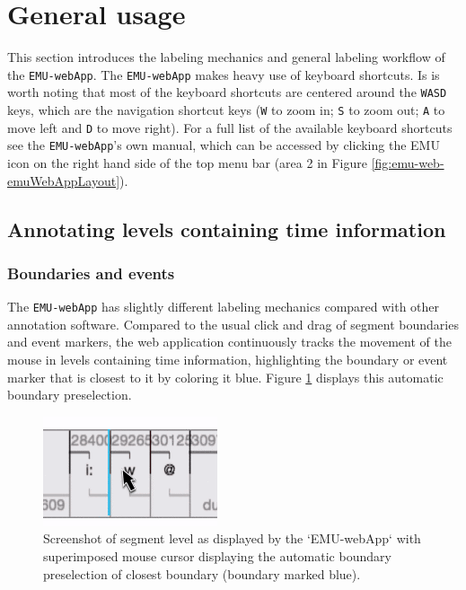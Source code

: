 \documentclass[]{book}
\theoremstyle{definition}
\theoremstyle{definition}
\theoremstyle{definition}
\theoremstyle{remark}
\begin{document}
\hypertarget{sec:webApp-generalUsage}{%
\section{General usage}\label{sec:webApp-generalUsage}}

This section introduces the labeling mechanics and general labeling
workflow of the \texttt{EMU-webApp}. The \texttt{EMU-webApp} makes heavy
use of keyboard shortcuts. Is is worth noting that most of the keyboard
shortcuts are centered around the \texttt{WASD} keys, which are the
navigation shortcut keys (\texttt{W} to zoom in; \texttt{S} to zoom out;
\texttt{A} to move left and \texttt{D} to move right). For a full list
of the available keyboard shortcuts see the \texttt{EMU-webApp}'s own
manual, which can be accessed by clicking the EMU icon on the right hand
side of the top menu bar (area 2 in Figure
\ref{fig:emu-web-emuWebAppLayout}).

\hypertarget{annotating-levels-containing-time-information}{%
\subsection{Annotating levels containing time
information}\label{annotating-levels-containing-time-information}}

\hypertarget{boundaries-and-events}{%
\subsubsection{Boundaries and events}\label{boundaries-and-events}}

The \texttt{EMU-webApp} has slightly different labeling mechanics
compared with other annotation software. Compared to the usual click and
drag of segment boundaries and event markers, the web application
continuously tracks the movement of the mouse in levels containing time
information, highlighting the boundary or event marker that is closest
to it by coloring it blue. Figure \ref{fig:webApp-preSelBoundary}
displays this automatic boundary preselection.

\begin{figure}

{\centering \includegraphics[width=0.4\linewidth]{pics/preSelBoundary} 

}

\caption{Screenshot of segment level as displayed by the `EMU-webApp` with superimposed mouse cursor displaying the automatic boundary preselection of closest boundary (boundary marked blue).}\label{fig:webApp-preSelBoundary}
\end{figure}
\end{document}
